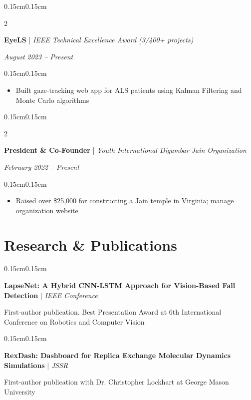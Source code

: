 \documentclass[10pt, letterpaper]{article}
\newenvironment{highlights}{
    \begin{itemize}[topsep=0pt, parsep=0pt, partopsep=0pt, itemsep=0pt, leftmargin=0.4cm]
}{
    \end{itemize}
}
\newenvironment{onecolentry}{
    \begin{adjustwidth}{0.15cm}{0.15cm}
}{
    \end{adjustwidth}
}
\newenvironment{twocolentry}[2][]{
    \onecolentry
    \def\secondColumn{#2}
    \setcolumnwidth{\fill, 4cm}
    \begin{paracol}{2}
}{
    \switchcolumn \raggedleft \secondColumn
    \end{paracol}
    \endonecolentry
}
\begin{document}
    \vspace{0.1cm}

    \begin{twocolentry}{\textit{August 2023 -- Present}}
        \textbf{EyeLS} | \textit{IEEE Technical Excellence Award (3/400+ projects)}
    \end{twocolentry}

    \vspace{0.05cm}
    \begin{onecolentry}
        \begin{highlights}
            \item Built gaze-tracking web app for ALS patients using Kalman Filtering and Monte Carlo algorithms
        \end{highlights}
    \end{onecolentry}

    \vspace{0.1cm}

    \begin{twocolentry}{\textit{February 2022 -- Present}}
        \textbf{President \& Co-Founder} | \textit{Youth International Digambar Jain Organization}
    \end{twocolentry}

    \vspace{0.05cm}
    \begin{onecolentry}
        \begin{highlights}
            \item Raised over \$25,000 for constructing a Jain temple in Virginia; manage organization website
        \end{highlights}
    \end{onecolentry}

    \section{Research \& Publications}

    \begin{onecolentry}
        \textbf{LapseNet: A Hybrid CNN-LSTM Approach for Vision-Based Fall Detection} | \textit{IEEE Conference}
        
        First-author publication. Best Presentation Award at 6th International Conference on Robotics and Computer Vision
    \end{onecolentry}

    \vspace{0.1cm}

    \begin{onecolentry}
        \textbf{RexDash: Dashboard for Replica Exchange Molecular Dynamics Simulations} | \textit{JSSR}
        
        First-author publication with Dr. Christopher Lockhart at George Mason University
    \end{onecolentry}
\end{document}

